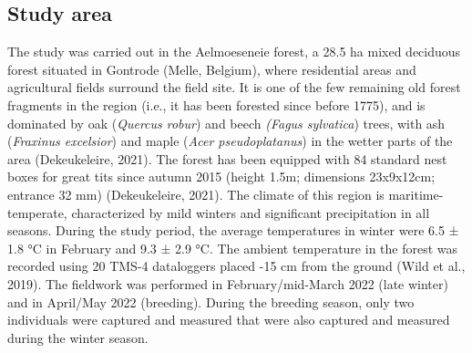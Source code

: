 \documentclass[10pt, twoside]{book} %
\begin{document}
\subsection{Study area} 
The study was carried out in the Aelmoeseneie forest, a 28.5 ha mixed deciduous forest situated in Gontrode (Melle, Belgium), where residential areas and agricultural fields surround the field site. It is one of the few remaining old forest fragments in the region (i.e., it has been forested since before 1775), and is dominated by oak (\textit{Quercus robur}) and beech \textit{(Fagus sylvatica}) trees, with ash (\textit{Fraxinus excelsior}) and maple (\textit{Acer pseudoplatanus}) in the wetter parts of the area (Dekeukeleire, 2021). The forest has been equipped with 84 standard nest boxes for great tits since autumn 2015 (height 1.5m; dimensions 23x9x12cm; entrance 32 mm) (Dekeukeleire, 2021). The climate of this region is maritime-temperate, characterized by mild winters and significant precipitation in all seasons. During the study period, the average temperatures in winter were 6.5 ± 1.8 °C in February and 9.3 ± 2.9 °C. The ambient temperature in the forest was recorded using 20 TMS-4 dataloggers placed -15 cm from the ground (Wild et al., 2019). The fieldwork was performed in February/mid-March 2022 (late winter) and in April/May 2022 (breeding). During the breeding season, only two individuals were captured and measured that were also captured and measured during the winter season.
\end{document}
